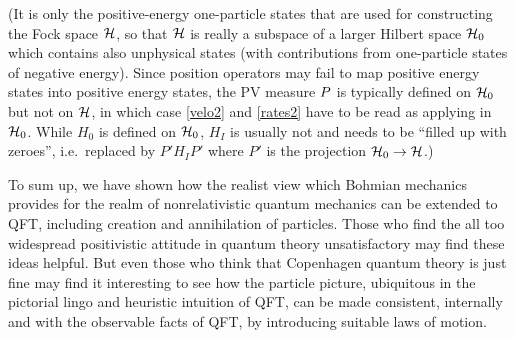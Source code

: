 \documentclass[prl, twocolumn, showpacs, superscriptaddress]{revtex4}%
\begin{document}
(It is only the positive-energy one-particle states that are used for
constructing the Fock space $\mathcal{H}$, so that $\mathcal{H}$ is really a
subspace of a larger Hilbert space $\mathcal{H}_0$ which contains also
unphysical states (with contributions from one-particle states of
negative energy).  Since position operators may fail to map positive
energy states into positive energy states, the PV measure ${P}$ is
typically defined on $\mathcal{H}_0$ but not on $\mathcal{H}$, in which case
\eqref{velo2} and \eqref{rates2} have to be read as applying in
$\mathcal{H}_0$.  While $H_0$ is defined on $\mathcal{H}_0$, $H_I$ is
usually not and needs to be ``filled up with zeroes'', i.e.\ replaced
by $P'H_IP'$ where $P'$ is the projection $\mathcal{H}_0 \to \mathcal{H}$.)

To sum up, we have shown how the realist view which Bohmian mechanics
provides for the realm of nonrelativistic quantum mechanics can be
extended to QFT, including creation and annihilation of particles.
Those who find the all too widespread positivistic attitude in quantum
theory unsatisfactory may find these ideas helpful.  But even those
who think that Copenhagen quantum theory is just fine may find it
interesting to see how the particle picture, ubiquitous in the
pictorial lingo and heuristic intuition of QFT, can be made
consistent, internally and with the observable facts of QFT, by
introducing suitable laws of motion.
\end{document}
